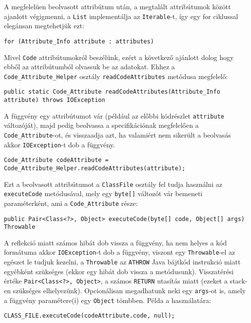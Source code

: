 A megfelelüen beolvasott attribútum után, a megtalált attribútumok között ajanlott végigmenni, a \lstinline{List} implementálja az \lstinline{Iterable}-t, így egy for ciklussal elegánsan megtehetjük ezt:
\begin{verbatim}
for (Attribute_Info attribute : attributes)
\end{verbatim}

Mivel \lstinline{Code} attribútumokról beszélünk, ezért a következő ajánlott dolog hogy ebből az attribútumból olvassuk be az adatokat. Ehhez a \lstinline{Code_Attribute_Helper} osztály \lstinline{readCodeAttributes} metódusa megfelelő:
\begin{verbatim}
public static Code_Attribute readCodeAttributes(Attribute_Info attribute) throws IOException
\end{verbatim}
A függvény egy attribútumot vár (például az előbbi kódrészlet \lstinline{attribute} változóját), majd pedig beolvassa a specifikációnak megfelelően a \lstinline{Code_Attribute}-ot, és visszaadja azt, ha valamiért nem sikerült a beolvasás akkor \lstinline{IOException}-t dob a függvény.
\begin{verbatim}
Code_Attribute codeAttribute = Code_Attribute_Helper.readCodeAttributes(attribute);
\end{verbatim}

Ezt a beolvasott attribútumot a \lstinline{ClassFile} osztály fel tudja használni az \lstinline{executeCode} metódusával, mely egy \lstinline{byte[]} változót vár bemeneti paraméterként, ami a \lstinline{Code_Attribute} része:
\begin{verbatim}
public Pair<Class<?>, Object> executeCode(byte[] code, Object[] args) Throwable
\end{verbatim}
A reflekció miatt számos hibát dob vissza a függvény, ha nem helyes a kód formátuma akkor \lstinline{IOException}-t dob a függvény, viszont egy \lstinline{Throwable}-el az egészet le tudjuk kezelni, a \lstinline{Throwable} az \lstinline{ATHROW} Java bájtkód instrukció miatt egyébként szükséges (ekkor egy hibát dob vissza a metódusunk).
Visszatérési értéke \lstinline{Pair<Class<?>, Object>}, a számos \lstinline{RETURN} utasítás miatt (ezeket a stack-en szükséges elhelyezünk).
Opcionálisan megadhatunk neki egy \lstinline{args}-ot is, amely a függvény paramétere(i) egy \lstinline{Object} tömbben.
Példa a használatára:
\begin{verbatim}
CLASS_FILE.executeCode(codeAttribute.code, null);
\end{verbatim}

